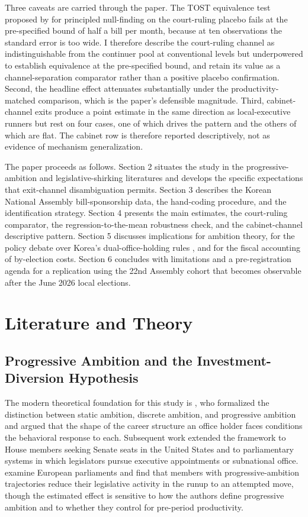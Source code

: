 \documentclass[11pt]{article}
\begin{document}
Three caveats are carried through the paper. The TOST equivalence test proposed by \citet{titiunik2017} for principled null-finding on the court-ruling placebo fails at the pre-specified bound of half a bill per month, because at ten observations the standard error is too wide. I therefore describe the court-ruling channel as indistinguishable from the continuer pool at conventional levels but underpowered to establish equivalence at the pre-specified bound, and retain its value as a channel-separation comparator rather than a positive placebo confirmation. Second, the headline effect attenuates substantially under the productivity-matched comparison, which is the paper's defensible magnitude. Third, cabinet-channel exits produce a point estimate in the same direction as local-executive runners but rest on four cases, one of which drives the pattern and the others of which are flat. The cabinet row is therefore reported descriptively, not as evidence of mechanism generalization.

The paper proceeds as follows. Section 2 situates the study in the progressive-ambition and legislative-shirking literatures and develops the specific expectations that exit-channel disambiguation permits. Section 3 describes the Korean National Assembly bill-sponsorship data, the hand-coding procedure, and the identification strategy. Section 4 presents the main estimates, the court-ruling comparator, the regression-to-the-mean robustness check, and the cabinet-channel descriptive pattern. Section 5 discusses implications for ambition theory, for the policy debate over Korea's dual-office-holding rules \citep{leeyj2020, oh2019}, and for the fiscal accounting of by-election costs. Section 6 concludes with limitations and a pre-registration agenda for a replication using the 22nd Assembly cohort that becomes observable after the June 2026 local elections.

\section{Literature and Theory}

\subsection{Progressive Ambition and the Investment-Diversion Hypothesis}

The modern theoretical foundation for this study is \citet{schlesinger1966}, who formalized the distinction between static ambition, discrete ambition, and progressive ambition and argued that the shape of the career structure an office holder faces conditions the behavioral response to each. Subsequent work extended the framework to House members seeking Senate seats in the United States and to parliamentary systems in which legislators pursue executive appointments or subnational office. \citet{hansen2015} examine European parliaments and find that members with progressive-ambition trajectories reduce their legislative activity in the runup to an attempted move, though the estimated effect is sensitive to how the authors define progressive ambition and to whether they control for pre-period productivity.
\end{document}
